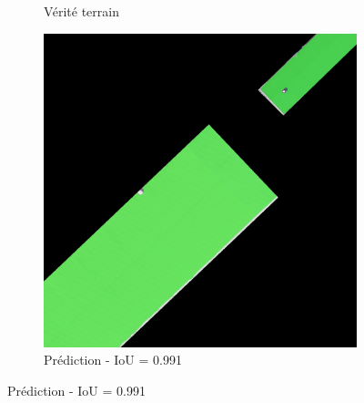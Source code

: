 \begin{figure}[H]
\begin{subfigure}{0.32\textwidth}
    \caption{Vérité terrain}
\end{subfigure}
\hfill
\begin{subfigure}{0.32\textwidth}
    \includegraphics[width=\textwidth]{02-main//figures/ch4/kfold_ensembles/unet_tu-mambaout_small/best_cases/best_4_iou0.991_24961121_tile_15_10_cc6553_overlay_pred.png}
    \caption{Prédiction - IoU = 0.991}
\end{subfigure}

\vspace{0.35cm}


\end{figure}
